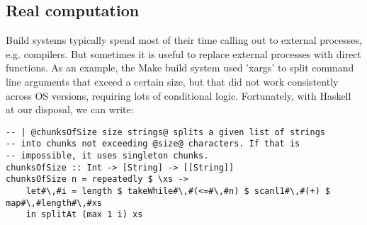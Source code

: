 %
%
%
%

\subsection{Real computation\label{sec:real_code}}

Build systems typically spend most of their time calling out to external
processes, e.g. compilers. But sometimes it is useful to replace external processes
with direct functions. As an example, the Make build system used \lst'xargs' to
split command line arguments that exceed a certain size, but that did not work
consistently across OS versions, requiring lots of conditional logic. 
Fortunately, with Haskell at our disposal, we can write:

\begin{lstlisting}
-- | @chunksOfSize size strings@ splits a given list of strings
-- into chunks not exceeding @size@ characters. If that is
-- impossible, it uses singleton chunks.
chunksOfSize :: Int -> [String] -> [[String]]
chunksOfSize n = repeatedly $ \xs ->
    let#\,#i = length $ takeWhile#\,#(<=#\,#n) $ scanl1#\,#(+) $ map#\,#length#\,#xs
    in splitAt (max 1 i) xs
\end{lstlisting}

